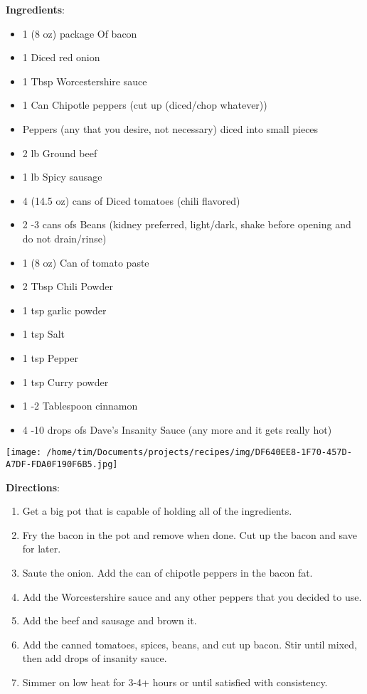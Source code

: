 \documentclass[11pt, twoside, openany]{book}
\begin{document}
\begin{minipage}[t]{0.8\linewidth}
\textbf{Ingredients}:\vspace{-3mm}
\begin{multicols}{2}
\begin{itemize}\setlength\itemsep{-1mm}
\item 1 (8 oz) package Of bacon
\item 1 Diced red onion
\item 1 Tbsp Worcestershire sauce
\item 1 Can Chipotle peppers (cut up (diced/chop whatever))
\item Peppers (any that you desire, not necessary) diced into small pieces
\item 2 lb Ground beef
\item 1 lb Spicy sausage
\item 4 (14.5 oz) cans of Diced tomatoes (chili flavored)
\item 2 -3 cans ofs Beans (kidney preferred, light/dark, shake before opening and do not drain/rinse)
\item 1 (8 oz) Can of tomato paste 
\item 2 Tbsp Chili Powder
\item 1 tsp garlic powder
\item 1 tsp Salt
\item 1 tsp Pepper
\item 1 tsp Curry powder
\item 1 -2 Tablespoon cinnamon
\item 4 -10 drops ofs Dave's Insanity Sauce (any more and it gets really hot)
\end{itemize}
\end{multicols}
\end{minipage}
\begin{minipage}[t]{0.2\linewidth}
\centering \strut\vspace*{-\baselineskip}\newline
\texttt{[image: /home/tim/Documents/projects/recipes/img/DF640EE8-1F70-457D-A7DF-FDA0F190F6B5.jpg]}\\
\end{minipage}\vspace{3mm}
\textbf{Directions}:
\vspace{-3mm}\begin{enumerate}\setlength\itemsep{-1mm}
\item Get a big pot that is capable of holding all of the ingredients. 
\item Fry the bacon in the pot and remove when done. Cut up the bacon and save for later.
\item Saute the onion. Add the can of chipotle peppers in the bacon fat. 
\item Add the Worcestershire sauce and any other peppers that you decided to use.
\item Add the beef and sausage and brown it.
\item Add the canned tomatoes, spices, beans, and cut up bacon. Stir until mixed, then add drops of insanity sauce.
\item Simmer on low heat for 3-4+ hours or until satisfied with consistency.
\end{enumerate}
\end{document}
